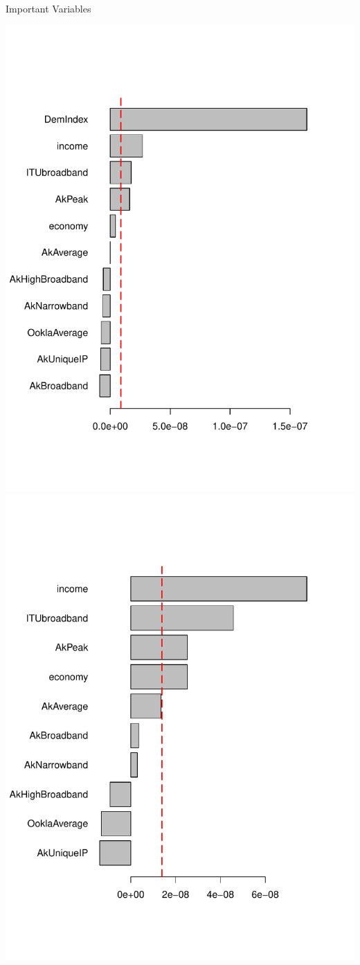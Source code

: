 \documentclass{beamer}
\begin{document}
\begin{frame}{Important Variables}
	\begin{center}
		\includegraphics[width=.5\textwidth]{ImportantVariables-caret.pdf}
	\includegraphics[width=.5\textwidth]{ImportantVariables-NoDemIndex.pdf}
	\end{center}
\end{frame}
\end{document}
